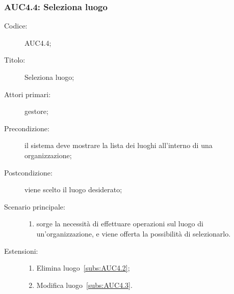 \subsubsection{AUC4.4: Seleziona luogo}%
\label{subs:AUC4.4}
\begin{description}
  \item[Codice:] AUC4.4;
  \item[Titolo:] Seleziona luogo;
  \item[Attori primari:] gestore;
  \item[Precondizione:] il sistema deve mostrare la lista dei luoghi all'interno di una organizzazione;
  \item[Postcondizione:] viene scelto il luogo desiderato;
  \item[Scenario principale:]
  \begin{enumerate}
    \item sorge la necessità di effettuare operazioni sul luogo di un'organizzazione, e viene offerta la possibilità di selezionarlo.
  \end{enumerate}
  \item[Estensioni:]
  \begin{enumerate}
    \item Elimina luogo~\ref{subs:AUC4.2};
    \item Modifica luogo~\ref{subs:AUC4.3}.
  \end{enumerate}
\end{description}

